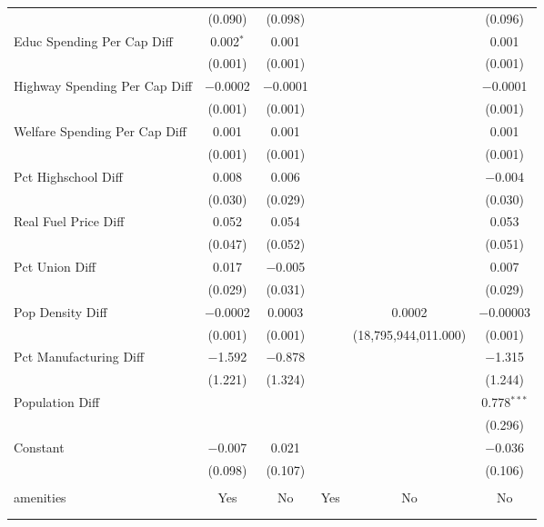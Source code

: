 \begin{table}[!htbp]
\begin{tabular}{@{\extracolsep{5pt}}lccccc}
  & (0.090) & (0.098) &  &  & (0.096) \\ 
  Educ Spending Per Cap Diff & 0.002$^{*}$ & 0.001 &  &  & 0.001 \\ 
  & (0.001) & (0.001) &  &  & (0.001) \\ 
  Highway Spending Per Cap Diff & $-$0.0002 & $-$0.0001 &  &  & $-$0.0001 \\ 
  & (0.001) & (0.001) &  &  & (0.001) \\ 
  Welfare Spending Per Cap Diff & 0.001 & 0.001 &  &  & 0.001 \\ 
  & (0.001) & (0.001) &  &  & (0.001) \\ 
  Pct Highschool Diff & 0.008 & 0.006 &  &  & $-$0.004 \\ 
  & (0.030) & (0.029) &  &  & (0.030) \\ 
  Real Fuel Price Diff & 0.052 & 0.054 &  &  & 0.053 \\ 
  & (0.047) & (0.052) &  &  & (0.051) \\ 
  Pct Union Diff & 0.017 & $-$0.005 &  &  & 0.007 \\ 
  & (0.029) & (0.031) &  &  & (0.029) \\ 
  Pop Density Diff & $-$0.0002 & 0.0003 &  & 0.0002 & $-$0.00003 \\ 
  & (0.001) & (0.001) &  & (18,795,944,011.000) & (0.001) \\ 
  Pct Manufacturing Diff & $-$1.592 & $-$0.878 &  &  & $-$1.315 \\ 
  & (1.221) & (1.324) &  &  & (1.244) \\ 
  Population Diff &  &  &  &  & 0.778$^{***}$ \\ 
  &  &  &  &  & (0.296) \\ 
  Constant & $-$0.007 & 0.021 &  &  & $-$0.036 \\ 
  & (0.098) & (0.107) &  &  & (0.106) \\ 
 \hline \\[-1.8ex] 
amenities & Yes & No & Yes & No & No \\ 
\hline \\[-1.8ex] 
\hline 
\hline \\[-1.8ex] 
\end{tabular} 
\end{table} 

